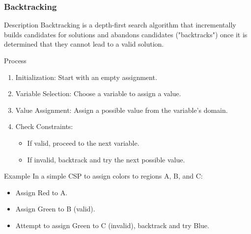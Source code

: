 \documentclass[aspectratio=169]{beamer}
\begin{document}
\begin{frame}[fragile]
    \frametitle{Backtracking}
    \begin{block}{Description}
        Backtracking is a depth-first search algorithm that incrementally builds candidates for solutions and abandons candidates ("backtracks") once it is determined that they cannot lead to a valid solution.
    \end{block}
    
    \begin{block}{Process}
        \begin{enumerate}
            \item Initialization: Start with an empty assignment.
            \item Variable Selection: Choose a variable to assign a value.
            \item Value Assignment: Assign a possible value from the variable's domain.
            \item Check Constraints:
                \begin{itemize}
                    \item If valid, proceed to the next variable.
                    \item If invalid, backtrack and try the next possible value.
                \end{itemize}
        \end{enumerate}
    \end{block}
    
    \begin{block}{Example}
        In a simple CSP to assign colors to regions A, B, and C:
        \begin{itemize}
            \item Assign Red to A.
            \item Assign Green to B (valid).
            \item Attempt to assign Green to C (invalid), backtrack and try Blue.
        \end{itemize}
    \end{block}
\end{frame}
\end{document}
